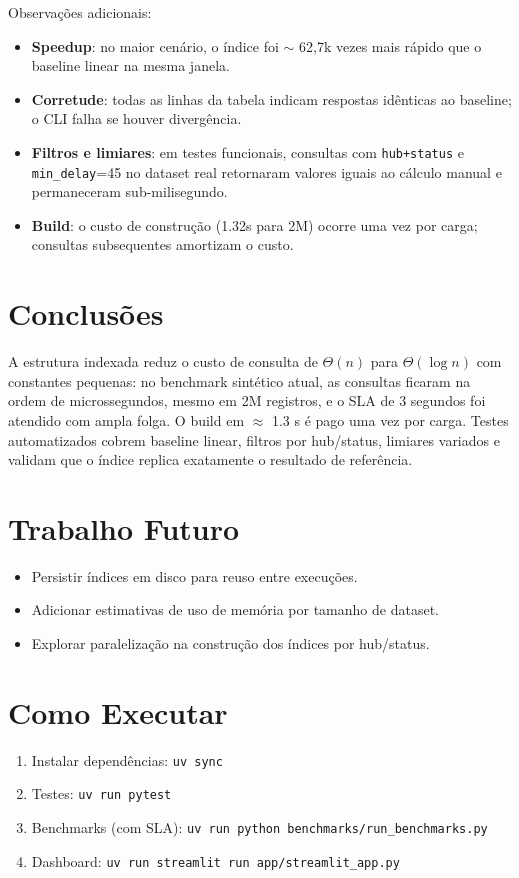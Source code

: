 \documentclass[12pt]{article}
\begin{document}
Observações adicionais:
\begin{itemize}
  \item \textbf{Speedup}: no maior cenário, o índice foi $\sim$ 62{,}7k vezes mais rápido que o baseline linear na mesma janela.
  \item \textbf{Corretude}: todas as linhas da tabela indicam respostas idênticas ao baseline; o CLI falha se houver divergência.
  \item \textbf{Filtros e limiares}: em testes funcionais, consultas com \texttt{hub+status} e \texttt{min\_delay}=45 no dataset real retornaram valores iguais ao cálculo manual e permaneceram sub-milisegundo.
  \item \textbf{Build}: o custo de construção (1.32s para 2M) ocorre uma vez por carga; consultas subsequentes amortizam o custo.
\end{itemize}

\section{Conclusões}
A estrutura indexada reduz o custo de consulta de $\Theta(n)$ para $\Theta(\log n)$ com constantes pequenas: no benchmark sintético atual, as consultas ficaram na ordem de microssegundos, mesmo em 2M registros, e o SLA de 3 segundos foi atendido com ampla folga. O build em $\approx$ 1.3 s é pago uma vez por carga. Testes automatizados cobrem baseline linear, filtros por hub/status, limiares variados e validam que o índice replica exatamente o resultado de referência.

\section{Trabalho Futuro}
\begin{itemize}
  \item Persistir índices em disco para reuso entre execuções.
  \item Adicionar estimativas de uso de memória por tamanho de dataset.
  \item Explorar paralelização na construção dos índices por hub/status.
\end{itemize}

\section{Como Executar}
\begin{enumerate}
  \item Instalar dependências: \texttt{uv sync}
  \item Testes: \texttt{uv run pytest}
  \item Benchmarks (com SLA): \texttt{uv run python benchmarks/run\_benchmarks.py}
  \item Dashboard: \texttt{uv run streamlit run app/streamlit\_app.py}
\end{enumerate}
\end{document}
